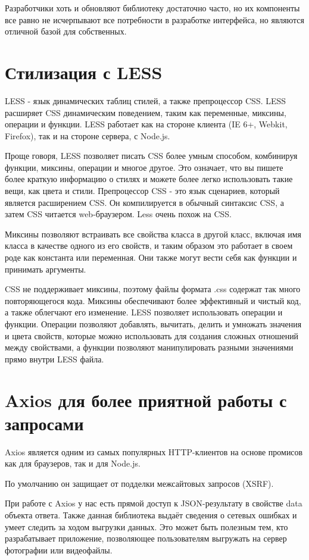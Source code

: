 \documentclass[14pt, a4paper]{diplom}
\begin{document}
Разработчики хоть и обновляют библиотеку достаточно часто, но их компоненты все равно не исчерпывают все потребности в разработке интерфейса,
но являются отличной базой для собственных.

\section{Стилизация с LESS}

LESS - язык динамических таблиц стилей, а также препроцессор CSS.
LESS расширяет CSS динамическим поведением, таким как переменные, миксины, операции и функции. LESS работает как на стороне клиента (IE 6+, Webkit, Firefox), так и на стороне сервера, с Node.js.

Проще говоря, LESS позволяет писать CSS более умным способом, комбинируя функции, миксины, операции и многое другое. Это означает, что вы пишете более краткую информацию о стилях и можете более легко использовать такие вещи, как цвета и стили.
Препроцессор CSS - это язык сценариев, который является расширением CSS. Он компилируется в обычный синтаксис CSS, а затем CSS читается web-браузером. Less очень похож на CSS.

Миксины позволяют встраивать все свойства класса в другой класс, включая имя класса в качестве одного из его свойств, и таким образом это работает в своем роде как константа или переменная. Они также могут вести себя как функции и принимать аргументы. 

CSS не поддерживает миксины, поэтому файлы формата .css содержат так много повторяющегося кода. Миксины обеспечивают более эффективный и чистый код, а также облегчают его изменение.
LESS позволяет использовать операции и функции. Операции позволяют добавлять, вычитать, делить и умножать значения и цвета свойств, которые можно использовать для создания сложных отношений между свойствами, а функции позволяют манипулировать разными значениями прямо внутри LESS файла.

\section{Axios для более приятной работы с запросами}

Axios является одним из самых популярных HTTP-клиентов на основе промисов как для браузеров, так и для Node.js.

По умолчанию он защищает от подделки межсайтовых запросов (XSRF).

При работе с Axios у нас есть прямой доступ к JSON-результату в свойстве data объекта ответа.
Также данная библиотека выдаёт сведения о сетевых ошибках и умеет следить за ходом выгрузки данных. Это может быть полезным тем, кто разрабатывает приложение, позволяющее пользователям выгружать на сервер фотографии или видеофайлы.
\end{document}
